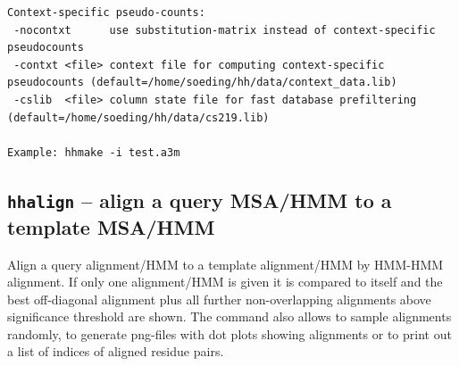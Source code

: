 \documentclass[11pt,a4paper]{article}
\begin{document}
\begin{verbatim}
Context-specific pseudo-counts:                                                  
 -nocontxt      use substitution-matrix instead of context-specific pseudocounts 
 -contxt <file> context file for computing context-specific pseudocounts (default=/home/soeding/hh/data/context_data.lib)
 -cslib  <file> column state file for fast database prefiltering (default=/home/soeding/hh/data/cs219.lib)

Example: hhmake -i test.a3m 
\end{verbatim} 
\normalsize



\subsection{{\tt hhalign} -- align a query MSA/HMM to a template MSA/HMM}

Align a query alignment/HMM to a template alignment/HMM by HMM-HMM alignment.
If only one alignment/HMM is given it is compared to itself and the best
off-diagonal alignment plus all further non-overlapping alignments above 
significance threshold are shown. The command also allows to sample
alignments randomly, to generate png-files with dot plots showing 
alignments or to print out a list of indices of aligned residue pairs. 
\end{document}
